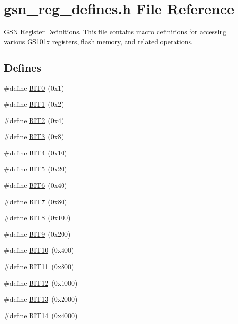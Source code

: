 \hypertarget{a00546}{
\section{gsn\_\-reg\_\-defines.h File Reference}
\label{a00546}
}


GSN Register Definitions. This file contains macro definitions for accessing various GS101x registers, flash memory, and related operations.  


\subsection*{Defines}
\begin{DoxyCompactItemize}
\item 
\#define \hyperlink{a00546_ad4d43f8748b542bce39e18790f845ecc}{BIT0}~(0x1)
\item 
\#define \hyperlink{a00546_a601923eba46784638244c1ebf2622a2a}{BIT1}~(0x2)
\item 
\#define \hyperlink{a00546_a9c9560bccccb00174801c728f1ed1399}{BIT2}~(0x4)
\item 
\#define \hyperlink{a00546_a8e44574a8a8becc885b05f3bc367ef6a}{BIT3}~(0x8)
\item 
\#define \hyperlink{a00546_aa731e0b6cf75f4e637ee88959315f5e4}{BIT4}~(0x10)
\item 
\#define \hyperlink{a00546_ae692bc3df48028ceb1ddc2534a993bb8}{BIT5}~(0x20)
\item 
\#define \hyperlink{a00546_acc2d074401e2b6322ee8f03476c24677}{BIT6}~(0x40)
\item 
\#define \hyperlink{a00546_aa6b8f3261ae9e2e1043380c192f7b5f0}{BIT7}~(0x80)
\item 
\#define \hyperlink{a00546_a0e80e65237843fa1ff15c68cd78066f8}{BIT8}~(0x100)
\item 
\#define \hyperlink{a00546_a3aa20ab5eb33383fa31b0e94f4401cdf}{BIT9}~(0x200)
\item 
\#define \hyperlink{a00546_a8c0f01fdf020d0f7467449b181fe95cb}{BIT10}~(0x400)
\item 
\#define \hyperlink{a00546_a2cda1debde057b596766eba6a76daca0}{BIT11}~(0x800)
\item 
\#define \hyperlink{a00546_aaa0a6acba8436baabcaa1e91fad6c0bd}{BIT12}~(0x1000)
\item 
\#define \hyperlink{a00546_a965dc1748ab1cf91426bd04a2fe16ecf}{BIT13}~(0x2000)
\item 
\#define \hyperlink{a00546_a41e750b67eb36c8da10328c565b90dd5}{BIT14}~(0x4000)

\end{DoxyCompactItemize}
